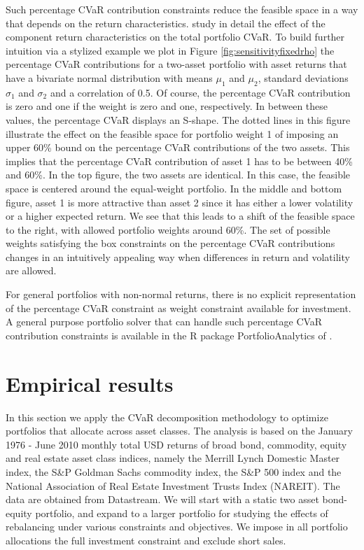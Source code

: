 \documentclass[12pt,a4paper]{article}
\begin{document}
Such percentage CVaR contribution constraints reduce the feasible space in a way that depends on the return characteristics. \citet{Stoyanov2009} study in detail the effect of the component return characteristics on the total portfolio CVaR. To build further intuition via a stylized example we plot in Figure \ref{fig:sensitivityfixedrho} the percentage CVaR contributions for a two-asset portfolio with asset returns that have a bivariate normal distribution with means $\mu_1$  and $\mu_2$, standard deviations $\sigma_1$ and $\sigma_2$  and a correlation of 0.5. Of course, the percentage CVaR contribution is zero and one if the weight is zero and one, respectively. In between these values, the percentage CVaR displays an S-shape. The dotted lines in this figure illustrate the effect on the feasible space for portfolio weight 1 of imposing an upper 60\% bound on the percentage CVaR contributions of the two assets. This implies that the percentage CVaR contribution of asset 1 has to be between 40\% and 60\%. In the top figure, the two assets are identical. In this case, the feasible space is centered around the equal-weight portfolio. In the middle and bottom figure, asset 1 is more attractive than asset 2 since it has either a lower volatility or a higher expected return. We see that this leads to a shift of the feasible space to the right, with allowed portfolio weights around 60\%. The set of possible weights satisfying the box constraints on the percentage CVaR contributions changes in an intuitively appealing way when differences in return and volatility are allowed.

For general portfolios with non-normal returns, there is no explicit representation of the percentage CVaR constraint as weight constraint available for investment. A general purpose portfolio solver that can handle such percentage CVaR contribution constraints is available in the R package PortfolioAnalytics of \citet{PortfolioAnalytics}.

\section{Empirical results \label{sec:empiricalresults}}


In this section we apply the CVaR decomposition methodology to optimize portfolios that allocate across asset classes. The analysis is based on the January 1976 - June 2010 monthly total USD returns of broad bond, commodity, equity and real estate asset class indices, namely the Merrill Lynch Domestic Master index,  the S\&P Goldman Sachs commodity index, the S\&P 500 index and the National Association of Real Estate Investment Trusts Index (NAREIT). The data are obtained from Datastream.  We will start with a static two asset bond-equity portfolio, and expand to a larger portfolio for studying the effects of rebalancing under various constraints and objectives. We impose in all portfolio allocations the full investment constraint and exclude short sales.
\end{document}
